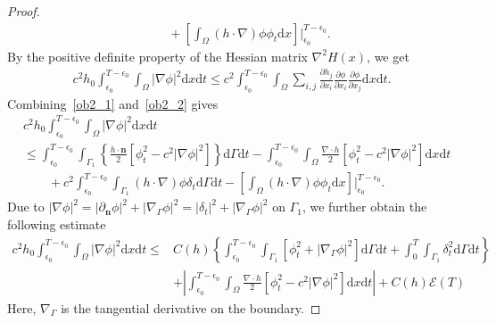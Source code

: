 \documentclass[10pt]{elsarticle}
\begin{document}
\begin{proof}
\begin{equation}
\begin{split}
	&\qquad+\left[\int_{\Omega}(h\cdot\nabla) \phi \phi_t \mathrm{d}x\right]\bigg|_{\epsilon_0}^{T-\epsilon_0}.
\end{split}
\end{equation}
By the positive definite property of the Hessian matrix $\nabla^2 H(x)$, we get 
\begin{equation}\label{ob2_2}
\begin{split}
	c^2 h_{0}\int_{\epsilon_0}^{T-\epsilon_0}\int_{\Omega}|\nabla\phi|^2  \mathrm{d}x\mathrm{d}t \leqslant c^2\int_{\epsilon_0}^{T-\epsilon_0}\int_{\Omega}\sum_{i, j}\frac{\partial h_j}{\partial x_i}\frac{\partial\phi}{\partial x_i}\frac{\partial\phi}{\partial x_j} \mathrm{d}x\mathrm{d}t.
\end{split}
\end{equation}
Combining~\eqref{ob2_1} and~\eqref{ob2_2} gives
\begin{equation*}
\begin{aligned}
	&c^2 h_{0}\int_{\epsilon_0}^{T-\epsilon_0}\int_{\Omega}|\nabla\phi|^2  \mathrm{d}x\mathrm{d}t\\
	&\leqslant \int_{\epsilon_0}^{T-\epsilon_0}\int_{\Gamma_1}\left\{\frac{h\cdot\mathbf{n}}{2}[\phi_t^2-c^2|\nabla\phi|^2]\right\}\mathrm{d}\Gamma \mathrm{d}t - \int_{\epsilon_0}^{T-\epsilon_0}\int_{\Omega}\frac{\nabla\cdot h}{2}[\phi_t^2-c^2|\nabla\phi|^2]\mathrm{d}x\mathrm{d}t\\
	&\qquad +c^2\int_{\epsilon_0}^{T-\epsilon_0}\int_{\Gamma_1}(h\cdot\nabla) \phi\delta_t \mathrm{d}\Gamma \mathrm{d}t-\left[\int_{\Omega}(h\cdot\nabla) \phi \phi_t \mathrm{d}x\right]\bigg|_{\epsilon_0}^{T-\epsilon_0}.
\end{aligned}
\end{equation*}
Due to $|\nabla\phi|^2=|\partial_{ \mathbf{n}}\phi|^2 + |\nabla_{\Gamma}\phi|^2=|\delta_t|^2 + |\nabla_{\Gamma}\phi|^2$ on $\Gamma_1$, we further obtain the following estimate
\begin{equation}
\begin{aligned} \label{ob3}
	c^2 h_{0}\int_{\epsilon_0}^{T-\epsilon_0}\int_{\Omega}|\nabla\phi|^2  \mathrm{d}x\mathrm{d}t\leqslant& C(h)\left\{\int_{\epsilon_0}^{T-\epsilon_0}\int_{\Gamma_1}[\phi_t^2 + |\nabla_{\Gamma}\phi|^2]\mathrm{d}\Gamma \mathrm{d}t+\int_{0}^{T}\int_{\Gamma_1}\delta_t^2\mathrm{d}\Gamma \mathrm{d}t \right\}\\
	&+ \left|\int_{\epsilon_0}^{T-\epsilon_0}\int_{\Omega}\frac{\nabla\cdot h}{2}[\phi_t^2-c^2|\nabla\phi|^2] \mathrm{d}x\mathrm{d}t\right| +C(h)\mathcal{E}(T)
\end{aligned}
\end{equation}
Here, $\nabla_{\Gamma}$ is the tangential derivative on the boundary.


\end{proof}
\end{document}
